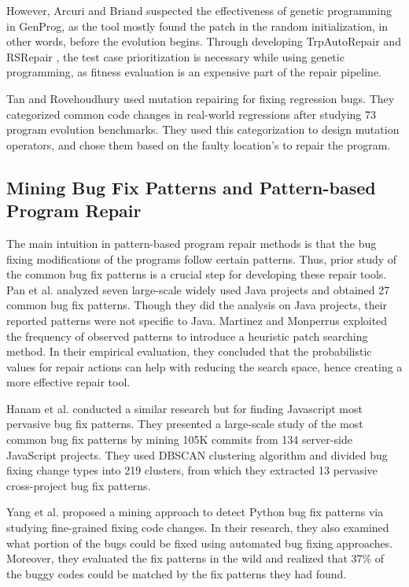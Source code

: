 However, Arcuri and Briand \cite{arcuri2011practical} suspected the effectiveness of genetic programming in GenProg, as the tool mostly found the patch in the random initialization, in other words, before the evolution begins. Through developing TrpAutoRepair \cite{qi2013efficient} and RSRepair \cite{qi2014strength}, the test case prioritization is necessary while using genetic programming, as fitness evaluation is an expensive part of the repair pipeline.

Tan and Rovehoudhury \cite{tan2015relifix} used mutation repairing for fixing regression bugs. They categorized common code changes in real-world regressions after studying 73 program evolution benchmarks. They used this categorization to design mutation operators, and chose them based on the faulty location’s to repair the program.

\subsection{Mining Bug Fix Patterns and Pattern-based Program Repair}

The main intuition in pattern-based program repair methods is that the bug fixing modifications of the programs follow certain patterns. Thus, prior study of the common bug fix patterns is a crucial step for developing these repair tools. Pan et al. \cite{pan2009toward} analyzed seven large-scale widely used Java projects and obtained 27 common bug fix patterns. Though they did the analysis on Java projects, their reported patterns were not specific to Java. Martinez and Monperrus \cite{martinez2015mining} \cite{martinez2012mining} exploited the frequency of observed patterns to introduce a heuristic patch searching method. In their empirical evaluation, they concluded that the probabilistic values for repair actions can help with reducing the search space, hence creating a more effective repair tool.

Hanam et al. \cite{hanam2016discovering} conducted a similar research but for finding Javascript most pervasive bug fix patterns. They presented a large-scale study of the most common bug fix patterns by mining 105K commits from 134 server-side JavaScript projects. They used DBSCAN clustering algorithm and divided bug fixing change types into 219 clusters, from which they extracted 13 pervasive cross-project bug fix patterns. 

Yang et al. \cite{yang2022mining} proposed a mining approach to detect Python bug fix patterns via studying fine-grained fixing code changes. In their research, they also examined what portion of the bugs could be fixed using automated bug fixing approaches. Moreover, they evaluated the fix patterns in the wild and realized that 37\% of the buggy codes could be matched by the fix patterns they had found. 

